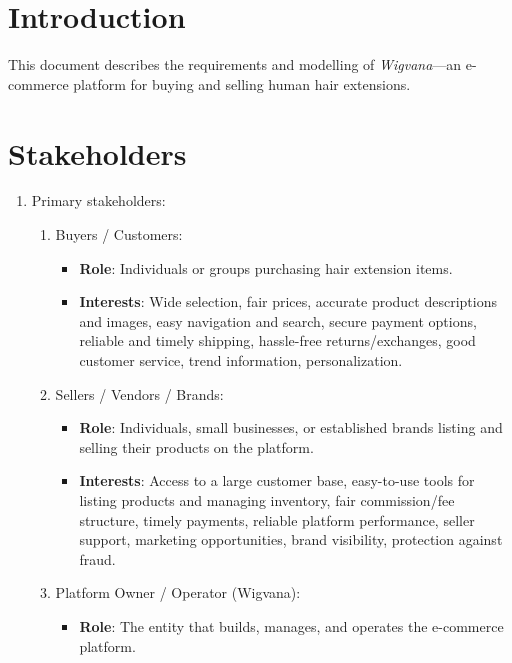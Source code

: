 \documentclass[a4paper,10pt]{article}
\begin{document}
\tableofcontents

\section{Introduction}

This document describes the requirements and modelling of \emph{Wigvana}---an e-commerce platform for buying and selling human hair extensions.

\section{Stakeholders}

\begin{enumerate}
    \item Primary stakeholders:
          \begin{enumerate}
              \item Buyers / Customers:
                    \begin{itemize}
                        \item \textbf{Role}: Individuals or groups purchasing hair extension items.
                        \item \textbf{Interests}: Wide selection, fair prices, accurate product descriptions and images, easy navigation and search, secure payment options, reliable and timely shipping, hassle-free returns/exchanges, good customer service, trend information, personalization.
                    \end{itemize}
              \item Sellers / Vendors / Brands:
                    \begin{itemize}
                        \item \textbf{Role}: Individuals, small businesses, or established brands listing and selling their products on the platform.
                        \item \textbf{Interests}: Access to a large customer base, easy-to-use tools for listing products and managing inventory, fair commission/fee structure, timely payments, reliable platform performance, seller support, marketing opportunities, brand visibility, protection against fraud.
                    \end{itemize}
              \item Platform Owner / Operator (Wigvana):
                    \begin{itemize}
                        \item \textbf{Role}: The entity that builds, manages, and operates the e-commerce platform.

\end{itemize}
\end{enumerate}
\end{enumerate}
\end{document}
